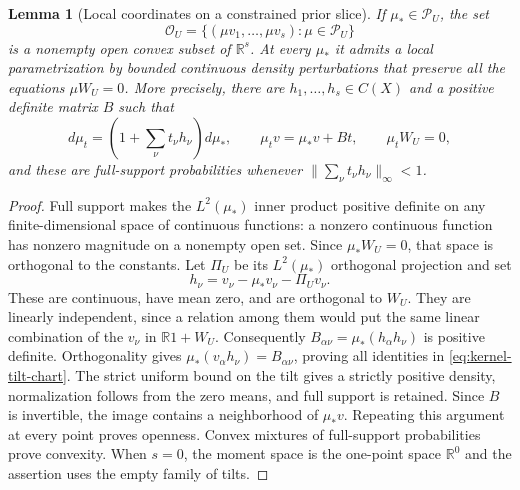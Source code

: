 \documentclass[11pt]{amsart}
\newtheorem{lemma}[theorem]{Lemma}
\theoremstyle{definition}\newtheorem{definition}[theorem]{Definition}
\theoremstyle{remark}\newtheorem{remark}[theorem]{Remark}
\newcommand{\R}{\mathbb R}\newcommand{\N}{\mathbb N}\newcommand{\C}{\mathbb C}
\begin{document}
\begin{lemma}[Local coordinates on a constrained prior slice]
\label{lem:kernel-moment-chart}
If $\mu_*\in\mathcal P_U$, the set
\[
 \mathcal O_U=\{(\mu v_1,\ldots,\mu v_s):\mu\in\mathcal P_U\}
\]
is a nonempty open convex subset of $\R^s$. At every $\mu_*$ it admits
a local parametrization by bounded continuous density perturbations
that preserve all the equations $\mu W_U=0$. More precisely, there are
$h_1,\ldots,h_s\in C(X)$ and a positive definite matrix $B$ such that
\begin{equation}\label{eq:kernel-tilt-chart}
 d\mu_t=(1+\textstyle\sum_\nu t_\nu h_\nu)d\mu_*,\qquad
 \mu_t v=\mu_*v+Bt,\qquad \mu_t W_U=0,
\end{equation}
and these are full-support probabilities whenever
$\|\sum_\nu t_\nu h_\nu\|_\infty<1$.
\end{lemma}
\begin{proof}
Full support makes the $L^2(\mu_*)$ inner product positive definite on
any finite-dimensional space of continuous functions: a nonzero
continuous function has nonzero magnitude on a nonempty open set.
Since $\mu_*W_U=0$, that space is orthogonal to the constants. Let
$\Pi_U$ be its $L^2(\mu_*)$ orthogonal projection and set
\[
 h_\nu=v_\nu-\mu_*v_\nu-\Pi_U v_\nu.
\]
These are continuous, have mean zero, and are orthogonal to $W_U$.
They are linearly independent, since a relation among them would put
the same linear combination of the $v_\nu$ in $\R1+W_U$.
Consequently $B_{\alpha\nu}=\mu_*(h_\alpha h_\nu)$ is positive
definite. Orthogonality gives
$\mu_*(v_\alpha h_\nu)=B_{\alpha\nu}$, proving all identities in
\eqref{eq:kernel-tilt-chart}. The strict uniform bound on the tilt
gives a strictly positive density, normalization follows from the
zero means, and full support is retained. Since $B$ is invertible,
the image contains a neighborhood of $\mu_*v$. Repeating this argument
at every point proves openness. Convex mixtures of full-support
probabilities prove convexity. When $s=0$, the moment space is the
one-point space $\R^0$ and the assertion uses the empty family of tilts.
\end{proof}
\end{document}
